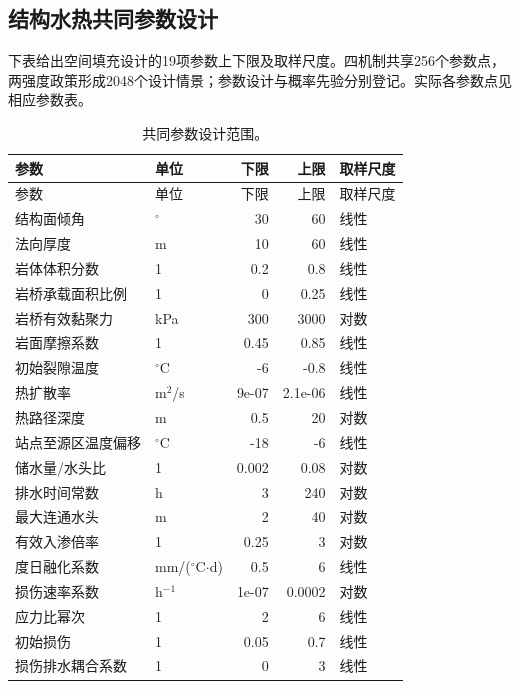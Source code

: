 \subsection{结构水热共同参数设计}\label{app:parameter-table}
下表给出空间填充设计的19项参数上下限及取样尺度。四机制共享256个参数点，两强度政策形成2048个设计情景；参数设计与概率先验分别登记。实际各参数点见相应参数表。
\begingroup\small\begin{longtable}{p{3.8cm}p{2.2cm}rrp{1.6cm}}
\caption{共同参数设计范围。}\label{tab:app-parameters}\\
\toprule 参数 & 单位 & 下限 & 上限 & 取样尺度\\\midrule\endfirsthead
\toprule 参数 & 单位 & 下限 & 上限 & 取样尺度\\\midrule\endhead
结构面倾角 & $^\circ$ & 30 & 60 & 线性\\
法向厚度 & m & 10 & 60 & 线性\\
岩体体积分数 & 1 & 0.2 & 0.8 & 线性\\
岩桥承载面积比例 & 1 & 0 & 0.25 & 线性\\
岩桥有效黏聚力 & kPa & 300 & 3000 & 对数\\
岩面摩擦系数 & 1 & 0.45 & 0.85 & 线性\\
初始裂隙温度 & $^\circ$C & -6 & -0.8 & 线性\\
热扩散率 & m$^2$/s & 9e-07 & 2.1e-06 & 线性\\
热路径深度 & m & 0.5 & 20 & 对数\\
站点至源区温度偏移 & $^\circ$C & -18 & -6 & 线性\\
储水量/水头比 & 1 & 0.002 & 0.08 & 对数\\
排水时间常数 & h & 3 & 240 & 对数\\
最大连通水头 & m & 2 & 40 & 对数\\
有效入渗倍率 & 1 & 0.25 & 3 & 对数\\
度日融化系数 & mm/($^\circ$C$\cdot$d) & 0.5 & 6 & 线性\\
损伤速率系数 & h$^{-1}$ & 1e-07 & 0.0002 & 对数\\
应力比幂次 & 1 & 2 & 6 & 线性\\
初始损伤 & 1 & 0.05 & 0.7 & 线性\\
损伤排水耦合系数 & 1 & 0 & 3 & 线性\\
\bottomrule\end{longtable}\endgroup
